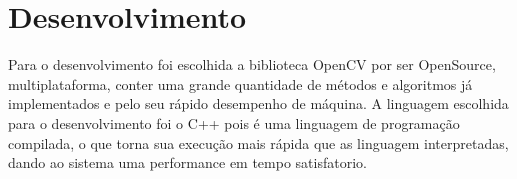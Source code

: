 	
	\chapter{Desenvolvimento} 
	
			Para o desenvolvimento foi escolhida a biblioteca OpenCV por ser OpenSource, multiplataforma, conter uma grande quantidade de métodos e algoritmos já implementados	e pelo seu rápido desempenho de máquina.
			A linguagem escolhida para o desenvolvimento foi o C++ pois é uma linguagem de programação compilada, o que torna sua execução mais rápida que as linguagem interpretadas, dando ao sistema uma performance em tempo satisfatorio.	
